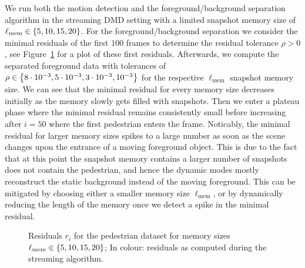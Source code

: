 We run both the motion detection and the foreground/background separation algorithm in the streaming DMD setting with a limited snapshot memory size of $\ell_\text{mem} \in \left\{5, 10, 15, 20\right\}$. For the foreground/background separation we consider the minimal residuals of the first $100$ frames to determine the residual tolerance $\rho > 0$, see Figure~\ref{fig:pedestrian-exp-residual} for a plot of these first residuals. Afterwards, we compute the separated foreground data with tolerances of $\rho \in \left\{8 \cdot 10^{-3}, 5 \cdot 10^{-3}, 3 \cdot 10^{-3}, 10^{-3}\right\}$ for the respective $\ell_\text{mem}$ snapshot memory size. We can see that the minimal residual for every memory size decreases initially as the memory slowly gets filled with snapshots. Then we enter a plateau phase where the minimal residual remains consistently small before increasing after $i = 50$ where the first pedestrian enters the frame. Noticably, the minimal residual for larger memory sizes spikes to a large number as soon as the scene changes upon the entrance of a moving foreground object. This is due to the fact that at this point the snapshot memory contains a larger number of snapshots does not contain the pedestrian, and hence the dynamic modes mostly reconstruct the static background instead of the moving foreground. This can be mitigated by choosing either a smaller memory size $\ell_\text{mem}$, or by dynamically reducing the length of the memory once we detect a spike in the minimal residual.

\begin{figure}[!ht]
    \centering
    \caption{Residuals $r_i$ for the pedestrian dataset for memory sizes $\ell_\text{mem} \in \left\{5, 10, 15, 20\right\}$; In colour: residuals as computed during the streaming algorithm.}\label{fig:pedestrian-exp-residual}
\end{figure}

